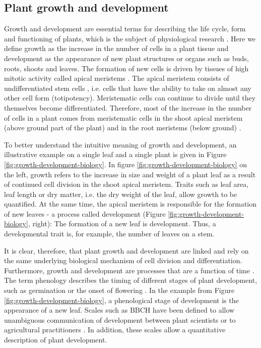 \subsection{Plant growth and development}
\label{subsec:intro-plant-growth-dev}

Growth and development are essential terms for describing the life cycle, form and functioning of plants, which is the subject of physiological research \citep{leopold_plant_1964}. Here we define growth as the increase in the number of cells in a plant tissue and development as the appearance of new plant structures or organs such as buds, roots, shoots and leaves. The formation of new cells is driven by tissues of high mitotic activity called apical meristems \citep{sinnott_growth_1939}. The apical meristem consists of undifferentiated stem cells \citep{bowman_formation_2000}, i.e. cells that have the ability to take on almost any other cell form (totipotency). Meristematic cells can continue to divide until they themselves become differentiated. Therefore, most of the increase in the number of cells in a plant comes from meristematic cells in the shoot apical meristem (above ground part of the plant) and in the root meristems (below ground) \citep{kerstetter_shoot_1997}.

To better understand the intuitive meaning of growth and development, an illustrative example on a single leaf and a single plant is given in Figure \ref{fig:growth-development-biology}. In figure \ref{fig:growth-development-biology} on the left, growth refers to the increase in size and weight of a plant leaf as a result of continued cell division in the shoot apical meristem. Traits such as leaf area, leaf length or dry matter, i.e. the dry weight of the leaf, allow growth to be quantified. At the same time, the apical meristem is responsible for the formation of new leaves - a process called development (Figure \ref{fig:growth-development-biology}, right): The formation of a new leaf is development. Thus, a developmental trait is, for example, the number of leaves on a stem.

It is clear, therefore, that plant growth and development are linked and rely on the same underlying biological mechanism of cell division and differentiation. Furthermore, growth and development are processes that are a function of time \citep{prusinkiewicz_modeling_2004}. The term phenology describes the timing of different stages of plant development, such as germination or the onset of flowering \citep{piao_plant_2019}. In the example from Figure \ref{fig:growth-development-biology}, a phenological stage of development is the appearance of a new leaf. Scales such as \gls{BBCH} have been defined to allow unambiguous communication of development between plant scientists or to agricultural practitioners \citep{lancashire_uniform_1991}. In addition, these scales allow a quantitative description of plant development.

